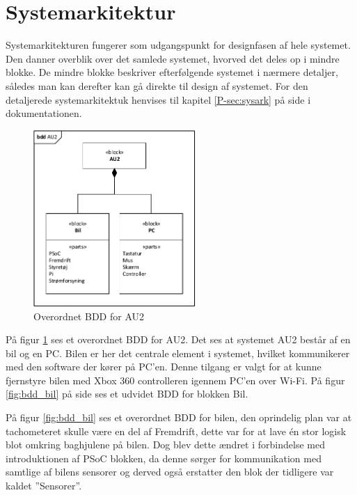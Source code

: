 \section{Systemarkitektur} \label{ch:Systemarkitektur}

Systemarkitekturen fungerer som udgangspunkt for designfasen af hele systemet.
Den danner overblik over det samlede systemet, hvorved det deles op i mindre blokke. 
De mindre blokke beskriver efterfølgende systemet i nærmere detaljer, således man kan derefter kan gå direkte til design af systemet. For den detaljerede systemarkitektuk henvises til kapitel \ref{P-sec:sysark}  på side \pageref{P-sec:sysark} i dokumentationen.

\begin{figure}[h]
\centering
\includegraphics[width=0.55\textwidth]{../fig/diagrammer/bdd_au2.pdf}
\caption{Overordnet BDD for AU2}
\label{fig:bdd_au2}
\end{figure}

På figur \ref{fig:bdd_au2} ses et overordnet BDD for AU2. 
Det ses at systemet AU2 består af en bil og en PC. 
Bilen er her det centrale element i systemet, hvilket kommunikerer med den software der kører på PC'en. 
Denne tilgang er valgt for at kunne fjernstyre bilen med Xbox 360 controlleren igennem PC'en over Wi-Fi. På figur \ref{fig:bdd_bil} på side \pageref{fig:bdd_bil} ses et udvidet BDD for blokken Bil.  

På figur \ref{fig:bdd_bil} ses et overordnet BDD for bilen, den oprindelig plan var at tachometeret skulle være en del af Fremdrift, dette var for at lave én stor logisk blot omkring baghjulene på bilen.
Dog blev dette ændret i forbindelse med introduktionen af PSoC blokken, da denne sørger for kommunikation med samtlige af bilens sensorer og derved også erstatter den blok der tidligere var kaldet ''Sensorer''.

